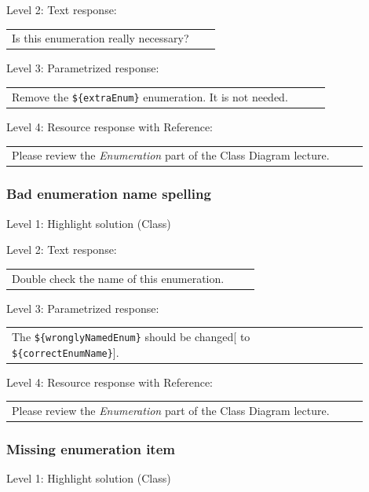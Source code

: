 \noindent Level 2: Text response: \medskip

\begin{tabular}{|p{0.9\linewidth}}
Is this enumeration really necessary?
\end{tabular} \medskip

\noindent Level 3: Parametrized response: \medskip

\begin{tabular}{|p{0.9\linewidth}}
Remove the \verb|${extraEnum}| enumeration. It is not needed.
\end{tabular} \medskip

\noindent Level 4: Resource response with Reference: \medskip

\begin{tabular}{|p{0.9\linewidth}}
Please review the \textit{Enumeration} part of the Class Diagram lecture.
\end{tabular} \medskip


\subsubsection{Bad enumeration name spelling}

\noindent Level 1: Highlight solution (Class) \medskip

\noindent Level 2: Text response: \medskip

\begin{tabular}{|p{0.9\linewidth}}
Double check the name of this enumeration.
\end{tabular} \medskip

\noindent Level 3: Parametrized response: \medskip

\begin{tabular}{|p{0.9\linewidth}}
The \verb|${wronglyNamedEnum}| should be changed[ to \verb|${correctEnumName}|].
\end{tabular} \medskip

\noindent Level 4: Resource response with Reference: \medskip

\begin{tabular}{|p{0.9\linewidth}}
Please review the \textit{Enumeration} part of the Class Diagram lecture.
\end{tabular} \medskip


\subsubsection{Missing enumeration item}

\noindent Level 1: Highlight solution (Class) \medskip

